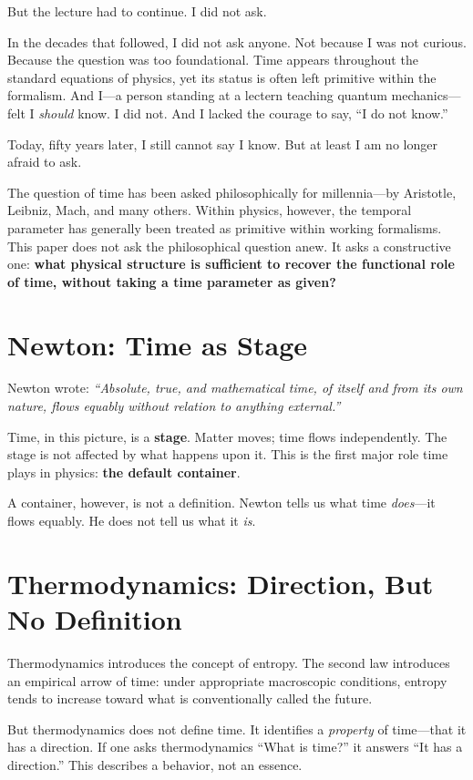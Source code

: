 \documentclass[12pt, a4paper]{article}
\begin{document}
But the lecture had to continue. I did not ask.

In the decades that followed, I did not ask anyone. Not because I was not curious. Because the question was too foundational. Time appears throughout the standard equations of physics, yet its status is often left primitive within the formalism. And I---a person standing at a lectern teaching quantum mechanics---felt I \textit{should} know. I did not. And I lacked the courage to say, ``I do not know.''

Today, fifty years later, I still cannot say I know. But at least I am no longer afraid to ask.

The question of time has been asked philosophically for millennia---by Aristotle, Leibniz, Mach, and many others. Within physics, however, the temporal parameter has generally been treated as primitive within working formalisms. This paper does not ask the philosophical question anew. It asks a constructive one: \textbf{what physical structure is sufficient to recover the functional role of time, without taking a time parameter as given?}

\section{Newton: Time as Stage}

Newton wrote: \textit{``Absolute, true, and mathematical time, of itself and from its own nature, flows equably without relation to anything external.''}

Time, in this picture, is a \textbf{stage}. Matter moves; time flows independently. The stage is not affected by what happens upon it. This is the first major role time plays in physics: \textbf{the default container}.

A container, however, is not a definition. Newton tells us what time \textit{does}---it flows equably. He does not tell us what it \textit{is}.

\section{Thermodynamics: Direction, But No Definition}

Thermodynamics introduces the concept of entropy. The second law introduces an empirical arrow of time: under appropriate macroscopic conditions, entropy tends to increase toward what is conventionally called the future.

But thermodynamics does not define time. It identifies a \textit{property} of time---that it has a direction. If one asks thermodynamics ``What is time?'' it answers ``It has a direction.'' This describes a behavior, not an essence.
\end{document}

